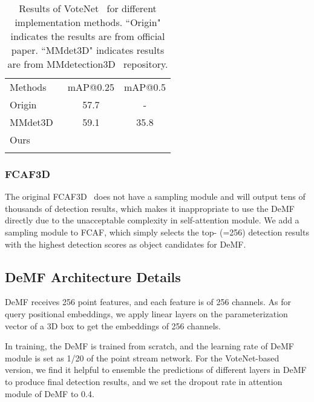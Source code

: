 \documentclass[runningheads]{llncs}
\begin{document}
\setlength{\tabcolsep}{6pt}
\begin{table}[t]
\begin{center}
\vspace{-20pt}
\caption{Results of VoteNet~\cite{qi2019deep} for different implementation methods. ``Origin" indicates the results are from official paper. ``MMdet3D" indicates results are from MMdetection3D~\cite{mmdet3d2020} repository.}
\vspace{6pt}
\label{table:votenet}
    \centering
        \begin{tabular}{lcc}
        \Xhline{0.8pt}\noalign{\smallskip}
        Methods &mAP@0.25  & mAP@0.5 \\
        \noalign{\smallskip}
        \hline
        \noalign{\smallskip}
        Origin & 57.7 & - \\
        MMdet3D~\cite{mmdet3d2020}& 59.1 & 35.8 \\
        Ours &  &  \\
        \Xhline{0.8pt}
        \end{tabular}
\end{center}
\end{table}
\setlength{\tabcolsep}{1.4pt}

\subsubsection{FCAF3D}
The original FCAF3D~\cite{rukhovich2021fcaf3d} does not have a sampling module and will output tens of thousands of detection results, which makes it inappropriate to use the DeMF directly due to the unacceptable complexity in self-attention module. 
We add a sampling module to FCAF, which simply selects the top- (=256) detection results with the highest detection scores as object candidates for DeMF.

\subsection{DeMF Architecture Details}
DeMF receives 256 point features, and each feature is of 256 channels. As for query positional embeddings, we apply linear layers on the parameterization vector of a 3D box to get the embeddings of 256 channels.

In training, the DeMF is trained from scratch, and the learning rate of DeMF module is set as 1/20 of the point stream network. 
For the VoteNet-based version, we find it helpful to ensemble the predictions of different layers in DeMF to produce final detection results, and we set the dropout rate in attention module of DeMF to 0.4.
\end{document}
